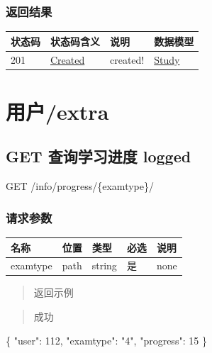 \documentclass[
]{article}
\newenvironment{Shaded}{}{}
\newcommand{\DataTypeTok}[1]{\textcolor[rgb]{0.56,0.13,0.00}{#1}}
\newcommand{\DecValTok}[1]{\textcolor[rgb]{0.25,0.63,0.44}{#1}}
\newcommand{\FunctionTok}[1]{\textcolor[rgb]{0.02,0.16,0.49}{#1}}
\newcommand{\StringTok}[1]{\textcolor[rgb]{0.25,0.44,0.63}{#1}}
\begin{document}
\hypertarget{ux8fd4ux56deux7ed3ux679c-36}{%
\subsubsection{返回结果}\label{ux8fd4ux56deux7ed3ux679c-36}}

\begin{longtable}[]{@{}llll@{}}
\toprule
状态码 & 状态码含义 & 说明 & 数据模型 \\
\midrule
\endhead
201 & \href{https://tools.ietf.org/html/rfc7231\#section-6.3.2}{Created}
& created! & \protect\hyperlink{schemastudy}{Study} \\
\bottomrule
\end{longtable}

\hypertarget{ux7528ux6237extra}{%
\section{用户/extra}\label{ux7528ux6237extra}}

\hypertarget{get-ux67e5ux8be2ux5b66ux4e60ux8fdbux5ea6-logged}{%
\subsection{GET 查询学习进度
logged}\label{get-ux67e5ux8be2ux5b66ux4e60ux8fdbux5ea6-logged}}

GET /info/progress/\{examtype\}/

\hypertarget{ux8bf7ux6c42ux53c2ux6570-35}{%
\subsubsection{请求参数}\label{ux8bf7ux6c42ux53c2ux6570-35}}

\begin{longtable}[]{@{}lllll@{}}
\toprule
名称 & 位置 & 类型 & 必选 & 说明 \\
\midrule
\endhead
examtype & path & string & 是 & none \\
\bottomrule
\end{longtable}

\begin{quote}
返回示例
\end{quote}

\begin{quote}
成功
\end{quote}

\begin{Shaded}
\begin{Highlighting}[]
\FunctionTok{\{}
  \DataTypeTok{"user"}\FunctionTok{:} \DecValTok{112}\FunctionTok{,}
  \DataTypeTok{"examtype"}\FunctionTok{:} \StringTok{"4"}\FunctionTok{,}
  \DataTypeTok{"progress"}\FunctionTok{:} \DecValTok{15}
\FunctionTok{\}}
\end{Highlighting}
\end{Shaded}
\end{document}
